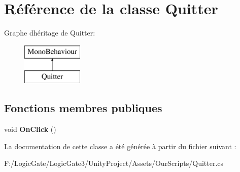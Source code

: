 \hypertarget{class_quitter}{}\section{Référence de la classe Quitter}
\label{class_quitter}
Graphe d\textquotesingle{}héritage de Quitter\+:\begin{figure}[H]
\begin{center}
\leavevmode
\includegraphics[height=2.000000cm]{class_quitter}
\end{center}
\end{figure}
\subsection*{Fonctions membres publiques}
\begin{DoxyCompactItemize}
\item 
\mbox{\label{class_quitter_af10a8e466768e82d4217df76d451268c}} 
void {\bfseries On\+Click} ()
\end{DoxyCompactItemize}


La documentation de cette classe a été générée à partir du fichier suivant \+:\begin{DoxyCompactItemize}
\item 
F\+:/\+Logic\+Gate/\+Logic\+Gate3/\+Unity\+Project/\+Assets/\+Our\+Scripts/Quitter.\+cs\end{DoxyCompactItemize}
